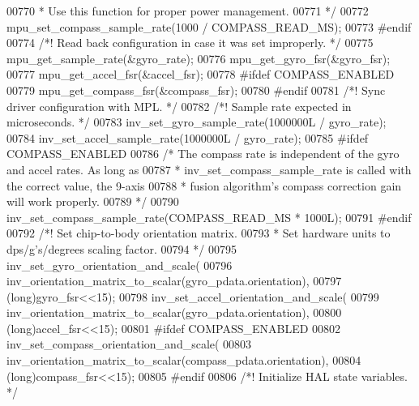 \begin{DoxyCode}
{{{{{{{{00770 \textcolor{comment}{     * Use this function for proper power management.}
00771 \textcolor{comment}{     */}
00772     mpu\_set\_compass\_sample\_rate(1000 / COMPASS\_READ\_MS);
00773 \textcolor{preprocessor}{#}\textcolor{preprocessor}{endif}
00774     \textcolor{comment}{/*! Read back configuration in case it was set improperly. */}
00775     mpu\_get\_sample\_rate(&gyro\_rate);
00776     mpu\_get\_gyro\_fsr(&gyro\_fsr);
00777     mpu\_get\_accel\_fsr(&accel\_fsr);
00778 \textcolor{preprocessor}{#}\textcolor{preprocessor}{ifdef} \textcolor{preprocessor}{COMPASS\_ENABLED}
00779     mpu\_get\_compass\_fsr(&compass\_fsr);
00780 \textcolor{preprocessor}{#}\textcolor{preprocessor}{endif}
00781     \textcolor{comment}{/*! Sync driver configuration with MPL. */}
00782     \textcolor{comment}{/*! Sample rate expected in microseconds. */}
00783     inv\_set\_gyro\_sample\_rate(1000000L / gyro\_rate);
00784     inv\_set\_accel\_sample\_rate(1000000L / gyro\_rate);
00785 \textcolor{preprocessor}{#}\textcolor{preprocessor}{ifdef} \textcolor{preprocessor}{COMPASS\_ENABLED}
00786     \textcolor{comment}{/* The compass rate is independent of the gyro and accel rates. As long as}
00787 \textcolor{comment}{     * inv\_set\_compass\_sample\_rate is called with the correct value, the 9-axis}
00788 \textcolor{comment}{     * fusion algorithm's compass correction gain will work properly.}
00789 \textcolor{comment}{     */}
00790     inv\_set\_compass\_sample\_rate(COMPASS\_READ\_MS * 1000L);
00791 \textcolor{preprocessor}{#}\textcolor{preprocessor}{endif}
00792     \textcolor{comment}{/*! Set chip-to-body orientation matrix.}
00793 \textcolor{comment}{     * Set hardware units to dps/g's/degrees scaling factor.}
00794 \textcolor{comment}{     */}
00795     inv\_set\_gyro\_orientation\_and\_scale(
00796             inv\_orientation\_matrix\_to\_scalar(gyro\_pdata.orientation),
00797             (\textcolor{keywordtype}{long})gyro\_fsr<<15);
00798     inv\_set\_accel\_orientation\_and\_scale(
00799             inv\_orientation\_matrix\_to\_scalar(gyro\_pdata.orientation),
00800             (\textcolor{keywordtype}{long})accel\_fsr<<15);
00801 \textcolor{preprocessor}{#}\textcolor{preprocessor}{ifdef} \textcolor{preprocessor}{COMPASS\_ENABLED}
00802     inv\_set\_compass\_orientation\_and\_scale(
00803             inv\_orientation\_matrix\_to\_scalar(compass\_pdata.orientation),
00804             (\textcolor{keywordtype}{long})compass\_fsr<<15);
00805 \textcolor{preprocessor}{#}\textcolor{preprocessor}{endif}
00806     \textcolor{comment}{/*! Initialize HAL state variables. */}
}}}}}}}}
\end{DoxyCode}
